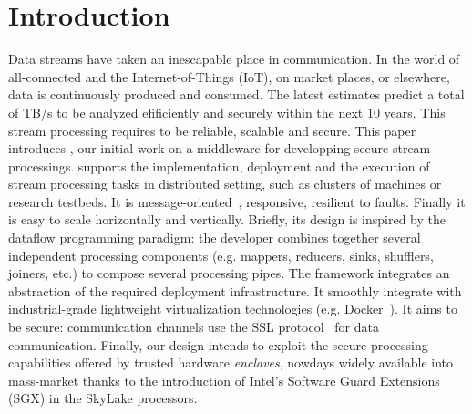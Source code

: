 \section{Introduction}
\label{sec:introduction}


Data streams have taken an inescapable place in communication.
In the world of all-connected and the Internet-of-Things (IoT), on market places, or elsewhere, data is continuously produced and consumed.
The latest estimates predict a total of  TB/s to be analyzed efificiently and securely within the next 10 years.
This stream processing requires to be reliable, scalable and secure.
This paper introduces \SYS, our initial work on a middleware for developping secure stream processings.
\SYS supports the implementation, deployment and the execution of stream processing tasks in distributed setting, such as clusters of machines or research testbeds.
It is message-oriented~\cite{mom}, responsive, resilient to faults.
Finally it is easy to scale horizontally and vertically.
Briefly, its design is inspired by the dataflow programming paradigm: the developer combines together several independent processing components (e.g. mappers, reducers, sinks, shufflers, joiners, etc.) to compose several processing pipes.%
The framework integrates an abstraction of the required deployment infrastructure.
It smoothly integrate with industrial-grade lightweight virtualization technologies (e.g. Docker~\cite{docker}).%
It aims to be secure: communication channels use the SSL protocol~\cite{freier2011secure} for data communication.
Finally, our design intends to exploit the secure processing capabilities offered by trusted hardware \emph{enclaves}, nowdays widely available into mass-market thanks to the introduction of Intel's Software Guard Extensions (SGX)\cite{costan_intel} in the SkyLake processors\cite{skylake}.

